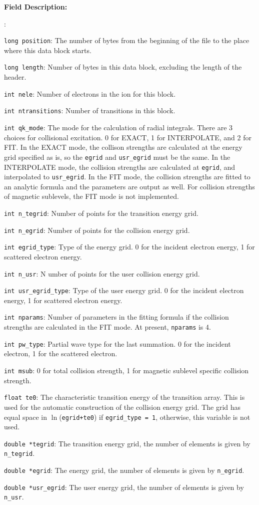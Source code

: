 \documentclass[twoside,letterpaper]{refrep}
\newenvironment{dbdesc}{\textbf{Field Description:} \begin{list}
	{:}{\setlength{\labelwidth}{2in}
	   \setlength{\leftmargin}{2in}
	   \setlength{\labelsep}{0.1in}
	   \setlength{\rightmargin}{0.2in}}}
	{\end{list}}
\begin{document}
\begin{dbdesc}
\item[\texttt{long position}:] The number of bytes from the beginning of the
file to the place where this data block starts.
\item[\texttt{long length}:] Number of bytes in this data block, excluding the
length of the header.
\item[\texttt{int nele}:] Number of electrons in the ion for this block.
\item[\texttt{int ntransitions}:] Number of transitions in this block.
\item[\texttt{int qk\_mode}:] The mode for the calculation of radial
integrals. There are 3 choices for collisional excitation. 0 for EXACT, 1 for
INTERPOLATE, and 2 for FIT. In the EXACT mode, the collison strengths are
calculated at the energy grid specified as is, so the \texttt{egrid} and
\texttt{usr\_egrid} must be the same. In the INTERPOLATE mode, the collision
strengths are calculated at \texttt{egrid}, and interpolated to
\texttt{usr\_egrid}. In the FIT mode, the collision strengths are fitted to an
analytic formula and the parameters are output as well. For collision
strengths of magnetic sublevels, the FIT mode is not implemented.
\item[\texttt{int n\_tegrid}:] Number of points for the transition energy grid.
\item[\texttt{int n\_egrid}:] Number of points for the collision energy grid.
\item[\texttt{int egrid\_type}:] Type of the energy grid. 0 for the incident
electron energy, 1 for scattered electron energy.
\item[\texttt{int n\_usr}:]N umber of points for the user collision energy
grid.
\item[\texttt{int usr\_egrid\_type}:] Type of the user energy grid. 0 for the
incident electron energy, 1 for scattered electron energy.
\item[\texttt{int nparams}:] Number of parameters in the fitting formula if the
collision strengths are calculated in the FIT mode. At present,
\texttt{nparams} is 4. 
\item[\texttt{int pw\_type}:] Partial wave type for the last summation. 0 for
the incident electron, 1 for the scattered electron.
\item[\texttt{int msub}:] 0 for total collision strength, 1 for magnetic
sublevel specific collision strength.
\item[\texttt{float te0}:] The characteristic transition energy of the 
transition array. This is used for the automatic construction of the 
collision energy grid. The grid has equal space in $\ln$(\texttt{egrid+te0})
if \texttt{egrid\_type = 1}, otherwise, this variable is not used.
\item[\texttt{double *tegrid}:] The transition energy grid, the number of
elements is given by \texttt{n\_tegrid}.
\item[\texttt{double *egrid}:] The energy grid, the number of elements is
given by \texttt{n\_egrid}.
\item[\texttt{double *usr\_egrid}:] The user energy grid, the number of
elements is given by \texttt{n\_usr}.
\end{dbdesc}
\end{document}
